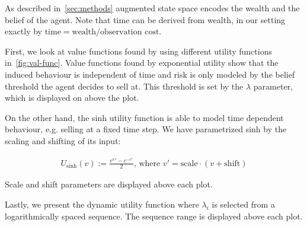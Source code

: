 
As described in~\autoref{sec:methods} augmented state space encodes the wealth and the belief of the agent. Note that time can be derived from wealth, in our setting exactly by $\text{time} = \text{wealth} / \text{observation cost}$.

First, we look at value functions found by using different utility functions in~\autoref{fig:val-func}.
Value functions found by exponential utility show that the induced behaviour is independent of time and risk is only modeled by the belief threshold the agent decides to sell at. This threshold is set by the $\lambda$ parameter, which is displayed on above the plot.

On the other hand, the sinh utility function is able to model time dependent behaviour, e.g. selling at a fixed time step. We have parametrized sinh by the scaling and shifting of its input:

\begin{align*}
    U_\text{sinh}(v) := \frac{e^v' - e^{-v'}}{2} \text{, where } v' = \text{scale}\cdot(v+\text{shift})
\end{align*}

Scale and shift parameters are displayed above each plot.

Lastly, we present the dynamic utility function where $\lambda_i$ is selected from a logarithmically spaced sequence. The sequence range is displayed above each plot.


